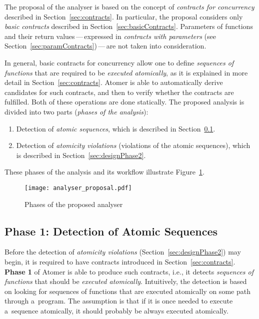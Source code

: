 The proposal of the analyser is based on the concept of \emph{contracts
for concurrency} described in Section~\ref{sec:contracts}. In particular,
the proposal considers only \emph{basic contracts} described in
Section~\ref{sec:basicContracts}. Parameters of functions and their
return values\,---\,expressed in \emph{contracts with parameters}
(see Section~\ref{sec:paramContracts})\,---\,are not taken into
consideration.

In general, basic contracts for concurrency allow one to define
\emph{sequences of functions} that are required to be \emph{executed
atomically}, as it is explained in more detail in Section~\ref{sec:contracts}.
Atomer is able to automatically derive candidates for such contracts, and
then to verify whether the contracts are fulfilled. Both of these operations
are done statically. The proposed analysis is divided into two parts
(\emph{phases of the analysis}):
\begin{enumerate}[label={\textbf{Phase \arabic*}:}, leftmargin=6em]
    \item
        Detection of \emph{atomic sequences}, which is described in
        Section~\ref{sec:designPhase1}.

    \item
        Detection of \emph{atomicity violations} (violations of the atomic
        sequences), which is described in Section~\ref{sec:designPhase2}.
\end{enumerate}
These phases of the analysis and its workflow illustrate
Figure~\ref{fig:analyserPhases}.

\begin{figure}[hbt]
    \centering
    \texttt{[image: analyser\_proposal.pdf]}
    \caption{Phases of the proposed analyser}
    \label{fig:analyserPhases}
\end{figure}


\subsection{Phase 1: Detection of Atomic Sequences}
\label{sec:designPhase1}

Before the detection of \emph{atomicity violations}
(Section~\ref{sec:designPhase2}) may begin, it is required to have
contracts introduced in Section~\ref{sec:contracts}. \textbf{Phase 1}
of Atomer is able to produce such contracts, i.e., it detects
\emph{sequences of functions} that should be \emph{executed atomically}.
Intuitively, the detection is based on looking for sequences of
functions that are executed atomically on some path through
a~program. The assumption is that if it is once needed to execute
a~sequence atomically, it should probably be always executed atomically.

